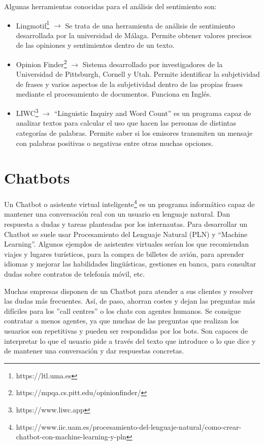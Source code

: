 Algunas herramientas conocidas para el análisis del sentimiento son:
\begin{itemize}
	\item Lingmotif\footnote{https://ltl.uma.es} $\rightarrow$ Se trata de una herramienta de análisis de sentimiento desarrollada por la universidad de Málaga. Permite obtener valores precisos de las opiniones y sentimientos dentro de un texto.
	\item Opinion Finder\footnote{https://mpqa.cs.pitt.edu/opinionfinder/} $\rightarrow$ Sistema desarrollado por investigadores de la Universidad de Pittsburgh, Cornell y Utah. Permite identificar la subjetividad de frases y varios aspectos de la subjetividad dentro de las propias frases mediante el procesamiento de documentos. Funciona en Inglés.
	\item LIWC\footnote{https://www.liwc.app} $\rightarrow$ ``Linguistic Inquiry and Word Count'' es un programa capaz de analizar textos para calcular el uso que hacen las personas de distintas categorías de palabras. Permite saber si los emisores transmiten un mensaje con palabras positivas o negativas entre otras muchas opciones.
\end{itemize}


\section{Chatbots} \label{chatbot}

Un Chatbot o asistente virtual inteligente\footnote{https://www.iic.uam.es/procesamiento-del-lenguaje-natural/como-crear-chatbot-con-machine-learning-y-pln} es un programa informático capaz de mantener una conversación real con un usuario en lenguaje natural. Dan respuesta a dudas y tareas planteadas por los internautas. Para desarrollar un Chatbot se suele usar Procesamiento del Lenguaje Natural (PLN) y ``Machine Learning''.  Algunos ejemplos de asistentes virtuales serían los que recomiendan viajes y lugares turísticos, para la compra de billetes de avión, para aprender idiomas y mejorar las habilidades lingüísticas, gestiones en banca, para consultar dudas sobre contratos de telefonía móvil, etc.

Muchas empresas disponen de un Chatbot para atender a sus clientes y resolver las dudas más frecuentes. Así, de paso, ahorran costes y dejan las preguntas más difíciles para los ''call centres'' o los chats con agentes humanos. Se consigue  contratar a menos agentes, ya que muchas de las preguntas que realizan los usuarios son repetitivas y pueden ser respondidas por los bots. Son capaces de interpretar lo que el usuario pide a través del texto que introduce o lo que dice y de mantener una conversación y dar respuestas concretas. 

